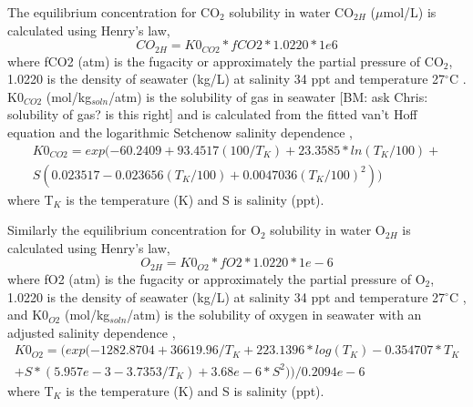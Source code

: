 \documentclass{ruthesis}
\begin{document}
The equilibrium concentration for CO$_2$ solubility in water CO$_{2H}$ ($\mu$mol/L) is calculated using Henry's law,
\begin{equation}\label{eq:CO2H_eq}
CO_{2H}=K0_{CO2}*fCO2*1.0220*1e6
\end{equation}
where fCO2 (atm) is the fugacity or approximately the partial pressure of CO$_2$, 1.0220 is the density of seawater (kg/L) at salinity 34 ppt and temperature 27$^{\circ}$C \cite{ramsing2011seawater} \cite{greensberg1992standard}. K0$_{CO2}$ (mol/kg$_{soln}$/atm) is the solubility of gas in seawater [BM: ask Chris: solubility of gas? is this right] and is calculated from the fitted van't Hoff equation and the logarithmic Setchenow salinity dependence \cite{weiss1974carbon},
\begin{equation}
\begin{aligned}
K0_{CO2} = exp(- 60.2409 + 93.4517(100/T_K)  + 23.3585*ln(T_K/100)+ \\
S(0.023517 - 0.023656(T_K/100) + 0.0047036(T_K/100)^2))
\end{aligned}
\end{equation}
where T$_K$ is the temperature (K) and S is salinity (ppt).




Similarly the equilibrium concentration for O$_2$ solubility in water O$_{2H}$ is calculated using Henry's law,
\begin{equation}\label{eq:O2H_eq}
O_{2H}=K0_{O2}*fO2*1.0220*1e-6
\end{equation}
where fO2 (atm) is the fugacity or approximately the partial pressure of O$_2$, 1.0220 is the density of seawater (kg/L) at salinity 34 ppt and temperature 27$^{\circ}$C \cite{ramsing2011seawater} \cite{greensberg1992standard}, and K0$_{O2}$ (mol/kg$_{soln}$/atm) is the solubility of oxygen in seawater with an adjusted salinity dependence \cite{battino1983solubility},
\begin{equation}
\begin{aligned}
K0_{O2} =  (exp(-1282.8704 + 36619.96/T_K + 223.1396*log(T_K) -0.354707*T_K \\
+ S*(5.957e-3 -3.7353/T_K) + 3.68e-6*S^2))/0.2094e-6
\end{aligned}
\end{equation}
where T$_K$ is the temperature (K) and S is salinity (ppt).
\end{document}
